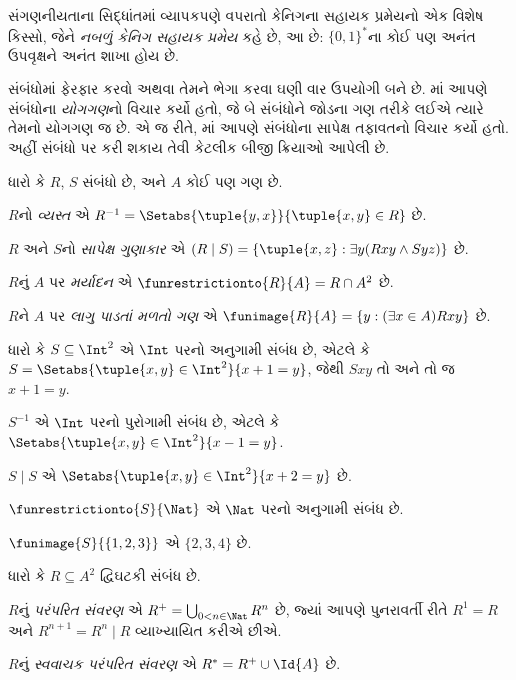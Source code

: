 સંગણનીયતાના સિદ્ધાંતમાં વ્યાપકપણે વપરાતો કેનિગના સહાયક
પ્રમેયનો એક વિશેષ કિસ્સો, જેને \emph{નબળું કેનિગ સહાયક પ્રમેય}
કહે છે, આ છે: $\{0,1\}^*$ના કોઈ પણ અનંત ઉપવૃક્ષને
અનંત શાખા હોય છે.
\endgroup


\begingroup
\makeatletter{}\makeatother

\label{guunit:OLP-0019}


સંબંધોમાં ફેરફાર કરવો અથવા તેમને ભેગા કરવા ઘણી વાર ઉપયોગી
બને છે. માં આપણે
સંબંધોના \emph{યોગગણ}નો વિચાર કર્યો હતો, જે બે સંબંધોને
જોડના ગણ તરીકે લઈએ ત્યારે તેમનો યોગગણ જ છે.
એ જ રીતે, માં
આપણે સંબંધોના સાપેક્ષ તફાવતનો વિચાર કર્યો હતો.
અહીં સંબંધો પર કરી શકાય તેવી કેટલીક બીજી ક્રિયાઓ આપેલી છે.

\begin{defn}
ધારો કે $R$, $S$ સંબંધો છે, અને $A$ કોઈ પણ ગણ છે.

$R$નો \emph{વ્યસ્ત} એ
$R^{-1} = \Setabs{\tuple{y, x}}{\tuple{x, y} \in R}$ છે.

$R$ અને $S$નો \emph{સાપેક્ષ ગુણાકાર} એ
$(R \mid S) = \{\tuple{x, z} : \exists y(Rxy \land Syz)\}$ છે.

$R$નું $A$ પર \emph{મર્યાદન} એ
$\funrestrictionto{R}{A}= R \cap A^2$ છે.

$R$ને $A$ પર \emph{લાગુ પાડતાં મળતો ગણ} એ
$\funimage{R}{A} = \{y : (\exists x \in A)Rxy\}$ છે.
\end{defn}

\begin{ex}
ધારો કે $S \subseteq \Int^2$ એ $\Int$ પરનો અનુગામી સંબંધ છે,
એટલે કે $S = \Setabs{\tuple{x, y} \in \Int^2}{x + 1 = y}$,
જેથી $Sxy$ તો અને તો જ $x + 1 = y$.

$S^{-1}$ એ $\Int$ પરનો પુરોગામી સંબંધ છે,
એટલે કે $\Setabs{\tuple{x,y}\in\Int^2}{x -1 =y}$.

$S\mid S$ એ
$ \Setabs{\tuple{x,y}\in\Int^2}{x + 2 =y}$ છે.

$\funrestrictionto{S}{\Nat}$ એ $\Nat$ પરનો અનુગામી સંબંધ છે.

$\funimage{S}{\{1,2,3\}}$ એ $\{2, 3, 4\}$ છે.
\end{ex}

\begin{defn}[પરંપરિત સંવરણ]ધારો કે $R \subseteq A^2$ દ્વિઘટકી સંબંધ છે.

$R$નું \emph{પરંપરિત સંવરણ} એ
$R^+ = \bigcup_{0 < n \in \Nat} R^n$ છે,
જ્યાં આપણે પુનરાવર્તી રીતે $R^1 = R$ અને
$R^{n+1} = R^n \mid R$ વ્યાખ્યાયિત કરીએ છીએ.

$R$નું \emph{સ્વવાચક પરંપરિત સંવરણ} એ
$R^* = R^+ \cup \Id{A}$ છે.
\end{defn}

